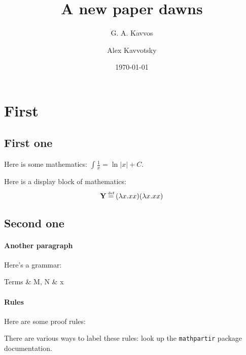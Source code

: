 \documentclass{gak-article}
\title{A new paper dawns}
\author{G. A. Kavvos \and Alex Kavvotsky}
\date{\today}
\begin{document}
\maketitle

\begin{abstract}
  \lipsum[1]
\end{abstract}

\tableofcontents


\section{First}
  \label{section:first}

\subsection{First one}
  Here is some mathematics: \( \int \frac{1}{x} = \ln |x| + C \).
  
  Here is a display block of mathematics:
  \[
    \mathbf{Y} \defeq (\lambda x. xx)(\lambda x. xx)
  \]

  \lipsum[1] \parencite{qian2021}

\subsection{Second one}
  \lipsum[2]
  
  \paragraph{Another paragraph}
  Here's a grammar:
  \begin{grammar}
    Terms & M, N & x \mid {} \mid {}
  \end{grammar}

  \lipsum[3]
  
  \paragraph{Rules}

  Here are some proof rules:
  There are various ways to label these rules: look up the \texttt{mathpartir} package documentation.
\end{document}
